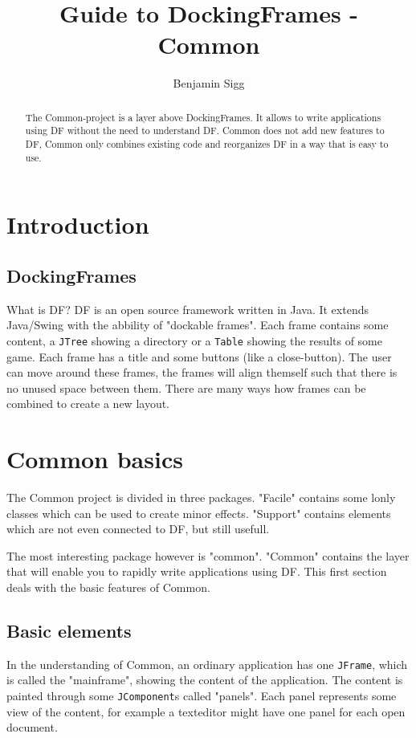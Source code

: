 \documentclass[a4paper,10pt]{article}
\title{Guide to DockingFrames - Common}
\author{Benjamin Sigg}
\newcommand{\src}[1]{\lstinline[basicstyle=\ttfamily]|#1|}
\begin{document}
\maketitle
\tableofcontents
\newpage

\begin{abstract}
The Common-project is a layer above DockingFrames. It allows to write applications using DF without the need to understand DF. Common does not add new features to DF, Common only combines existing code and reorganizes DF in a way that is easy to use.
\end{abstract}

\section{Introduction}
\subsection{DockingFrames}
What is DF? DF is an open source framework written in Java. It extends Java/Swing with the abbility of "dockable frames". Each frame contains some content, a \src{JTree} showing a directory or a \src{Table} showing the results of some game. Each frame has a title and some buttons (like a close-button). The user can move around these frames, the frames will align themself such that there is no unused space between them. There are many ways how frames can be combined to create a new layout.

\section{Common basics}
The Common project is divided in three packages. "Facile" contains some lonly classes which can be used to create minor effects. "Support" contains elements which are not even connected to DF, but still usefull.

The most interesting package however is "common". "Common" contains the layer that will enable you to rapidly write applications using DF. This first section deals with the basic features of Common.

\subsection{Basic elements}
In the understanding of Common, an ordinary application has one \src{JFrame}, which is called the "mainframe", showing the content of the application. The content is painted through some \src{JComponent}s called "panels". Each panel represents some view of the content, for example a texteditor might have one panel for each open document.
\end{document}
